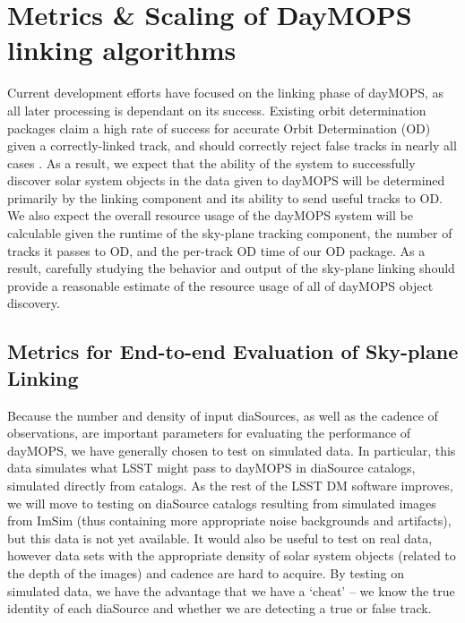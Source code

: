 \section{Metrics \& Scaling of DayMOPS linking algorithms}
\label{scalingLinking}

Current development efforts have focused on the linking
phase of dayMOPS, as all later processing is dependant on its
success. Existing orbit determination packages claim a high rate of
success for accurate Orbit Determination (OD) given a correctly-linked
track, and should correctly reject false tracks in nearly all cases
\citep{Milani2006}. As a result, we expect that the ability of the
system to successfully discover solar system objects in the data given
to dayMOPS will be determined primarily by the
linking component and its ability to send useful tracks to
OD.  We also expect the overall resource usage of the dayMOPS system
will be calculable given the runtime of the sky-plane tracking
component, the number of tracks it passes to OD, and the per-track OD
time of our OD package.  As a result, carefully studying the behavior
and output of the sky-plane linking should provide a reasonable
estimate of the resource usage of all of dayMOPS object discovery.


\subsection{Metrics for End-to-end Evaluation of Sky-plane Linking}

Because the number and density of input diaSources, as well as the
cadence of observations, are important parameters for evaluating the
performance of dayMOPS, we have generally chosen to test on simulated
data. In particular, this data simulates what LSST might pass to
dayMOPS in diaSource catalogs, simulated directly from catalogs. As
the rest of the LSST DM software improves, we will move to testing on
diaSource catalogs resulting from simulated images from ImSim (thus
containing more appropriate noise backgrounds and artifacts), but this
data is not yet available. It would also be useful to test on real
data, however data sets with the appropriate density of solar system
objects (related to the depth of the images) and cadence are
hard to acquire. By testing on simulated data, we have the advantage
that we have a `cheat' -- we know the true identity of each diaSource
and whether we are detecting a true or false track. 

